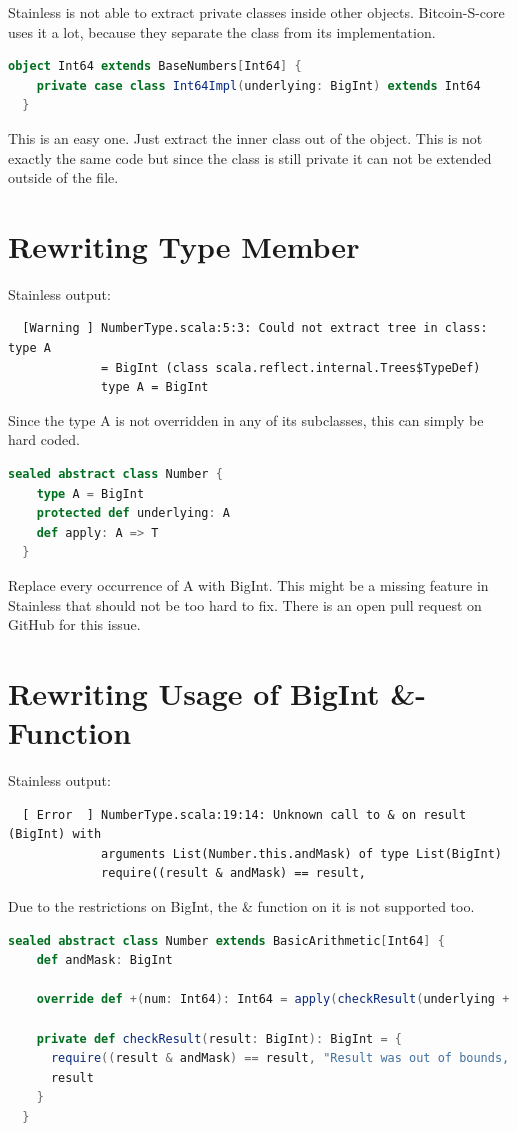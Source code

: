 Stainless is not able to extract private classes inside other objects.
Bitcoin-S-core uses it a lot, because they separate the class from its implementation.
\begin{lstlisting}[language=scala]
  object Int64 extends BaseNumbers[Int64] {
    private case class Int64Impl(underlying: BigInt) extends Int64 
  }
\end{lstlisting}

This is an easy one.
Just extract the inner class out of the object.
This is not exactly the same code but since the class is still private it can not be extended outside of the file.


\section{Rewriting Type Member}
Stainless output:
\begin{lstlisting}
  [Warning ] NumberType.scala:5:3: Could not extract tree in class: type A
             = BigInt (class scala.reflect.internal.Trees$TypeDef)
             type A = BigInt
\end{lstlisting}

Since the type A is not overridden in any of its subclasses, this can simply be hard coded.
\begin{lstlisting}[language=scala]
  sealed abstract class Number {
    type A = BigInt
    protected def underlying: A
    def apply: A => T
  }
\end{lstlisting}

Replace every occurrence of A with BigInt.
This might be a missing feature in Stainless that should not be too hard to fix.
There is an open pull request  on GitHub for this issue.


\section{Rewriting Usage of BigInt \&-Function}
Stainless output:
\begin{lstlisting}
  [ Error  ] NumberType.scala:19:14: Unknown call to & on result (BigInt) with
             arguments List(Number.this.andMask) of type List(BigInt)
             require((result & andMask) == result,
\end{lstlisting}

Due to the restrictions on BigInt, the \& function on it is not supported too.
\begin{lstlisting}[language=scala]
  sealed abstract class Number extends BasicArithmetic[Int64] {
    def andMask: BigInt

    override def +(num: Int64): Int64 = apply(checkResult(underlying + num.underlying))

    private def checkResult(result: BigInt): BigInt = {
      require((result & andMask) == result, "Result was out of bounds, got: " + result)
      result
    }
  }
\end{lstlisting}

